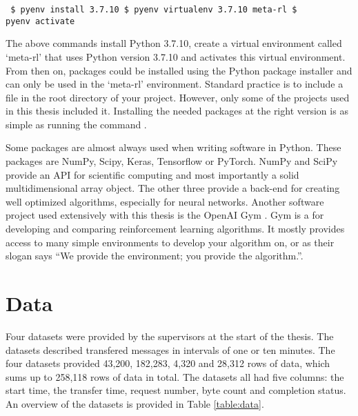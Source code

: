 \begin{verbatim} $ pyenv install 3.7.10 $ pyenv virtualenv 3.7.10 meta-rl $
pyenv activate \end{verbatim}

The above commands install Python 3.7.10, create a virtual environment called
`meta-rl' that uses Python version 3.7.10 and activates this virtual
environment. From then on, packages could be installed using the Python
package installer  and can only be used in the `meta-rl'
environment. Standard practice is to include a  file in
the root directory of your project. However, only some of the projects used in
this thesis included it. Installing the needed packages at the right version
is as simple as running the command .

Some packages are almost always used when writing \ai software in Python.
These packages are NumPy, Scipy, Keras, Tensorflow or PyTorch\footnotemark.
NumPy and SciPy provide an API for scientific computing and most importantly a
solid multidimensional array object. The other three provide a back-end for
creating well optimized \ml algorithms, especially for neural networks.
Another software project used extensively with this thesis is the OpenAI Gym
\cite{gym2016}. Gym is a for developing and comparing reinforcement learning
algorithms. It mostly provides access to many simple environments to develop
your \rl algorithm on, or as their slogan says ``We provide the environment;
you provide the algorithm.''.



\section{Data}\label{sec:data}

Four datasets were provided by the supervisors at the start of the thesis. The
datasets described transfered messages in intervals of one or ten minutes. The
four datasets provided 43,200, 182,283, 4,320 and 28,312 rows of data, which
sums up to 258,118 rows of data in total. The datasets all had five columns:
the start time, the transfer time, request number, byte count and completion
status. An overview of the datasets is provided in Table \ref{table:data}.



